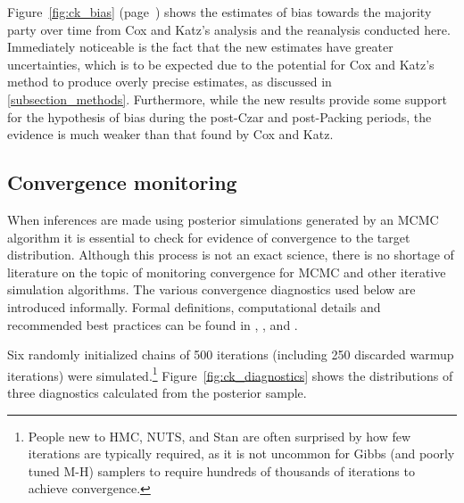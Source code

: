 Figure~\ref{fig:ck_bias} (page~\pageref{fig:ck_bias}) shows the estimates of bias towards the majority party over time from Cox and Katz's analysis and the reanalysis conducted here. Immediately noticeable is the fact that the new estimates have greater uncertainties, which is to be expected due to the potential for Cox and Katz's method to produce overly precise estimates, as discussed in \ref{subsection_methods}. Furthermore, while the new results provide some support for the hypothesis of bias during the post-Czar and post-Packing periods, the evidence is much weaker than that found by Cox and Katz. 


\subsection{Convergence monitoring}
\label{subsection_convergence}



When inferences are made using posterior simulations generated by an MCMC algorithm it is essential to check for evidence of convergence to the target distribution. Although this process is not an exact science, there is no shortage of literature on the topic of monitoring convergence for MCMC and other iterative simulation algorithms. The various convergence diagnostics used below are introduced informally. Formal definitions, computational details and recommended best practices can be found in , , and .

Six randomly initialized chains of 500 iterations (including 250 discarded warmup iterations) were simulated.\footnote{People new to HMC, NUTS, and Stan are often surprised by how few iterations are typically required, as it is not uncommon for Gibbs (and poorly tuned M-H) samplers to require hundreds of thousands of iterations to achieve convergence.} Figure~\ref{fig:ck_diagnostics} shows the distributions of three diagnostics calculated from the posterior sample. 

